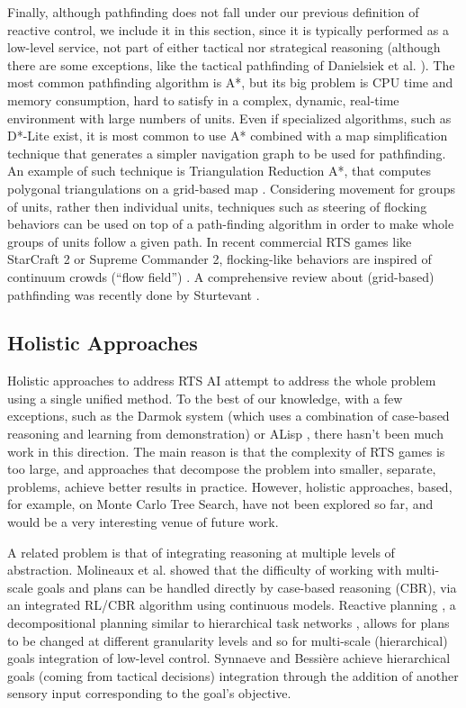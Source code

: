 \documentclass[journal]{IEEEtran}
\begin{document}
Finally, although pathfinding does not fall under our previous definition of reactive control, we include it in this section, since it is typically performed as a low-level service, not part of either tactical nor strategical reasoning (although there are some exceptions, like the tactical pathfinding of Danielsiek et al. \cite{Danielsiek_2008}). The most common pathfinding algorithm is A*, but its big problem is CPU time and memory consumption, hard to satisfy in a complex, dynamic, real-time environment with large numbers of units. Even if specialized algorithms, such as D*-Lite \cite{KoenigL02} exist, it is most common to use A* combined with a map simplification technique that generates a simpler navigation graph to be used for pathfinding. An example of such technique is Triangulation Reduction A*, that computes polygonal triangulations on a grid-based map \cite{Demyen_2006}. Considering movement for groups of units, rather then individual units, techniques such as steering of flocking behaviors \cite{Reynolds_1999} can be used on top of a path-finding algorithm in order to make whole groups of units follow a given path. In recent commercial RTS games like StarCraft 2 or Supreme Commander 2, flocking-like behaviors are inspired of continuum crowds (``flow field'') \cite{Treuille2006}. A comprehensive review about (grid-based) pathfinding was recently done by Sturtevant \cite{sturtevant2012benchmarks}.

\subsection{Holistic Approaches}

Holistic approaches to address RTS AI attempt to address the whole problem using a single unified method. To the best of our knowledge, with a few exceptions, such as the Darmok system \cite{OntanonMSR10} (which uses a combination of case-based reasoning and learning from demonstration) or ALisp \cite{Marthi05}, there hasn't been much work in this direction.   The main reason is that the complexity of RTS games is too large, and approaches that decompose the problem into smaller, separate, problems, achieve better results in practice. However, holistic approaches, based, for example, on Monte Carlo Tree Search, have not been explored so far, and would be a very interesting venue of future work.

A related problem is that of integrating reasoning at multiple levels of abstraction. Molineaux et al. \cite{Molineaux08} showed that the difficulty of working with multi-scale goals and plans can be handled directly by case-based reasoning (CBR), via an integrated RL/CBR algorithm using continuous models. Reactive planning \cite{WeberCig10}, a decompositional planning similar to hierarchical task networks \cite{HTNPlanning}, allows for plans to be changed at different granularity levels and so for multi-scale (hierarchical) goals integration of low-level control. Synnaeve and Bessi\`{e}re \cite{SynnaeveMicroCig11} achieve hierarchical goals (coming from tactical decisions) integration through the addition of another sensory input corresponding to the goal's objective. 
\end{document}
